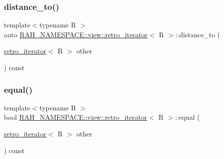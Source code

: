 \mbox{\label{struct_r_a_h___n_a_m_e_s_p_a_c_e_1_1view_1_1retro__iterator_a5332cbcf2b00984baeac1c823c163a1c}} 
\subsubsection{\texorpdfstring{distance\_to()}{distance\_to()}}
{\footnotesize\ttfamily template$<$typename R $>$ \\
auto \mbox{\hyperlink{struct_r_a_h___n_a_m_e_s_p_a_c_e_1_1view_1_1retro__iterator}{R\+A\+H\+\_\+\+N\+A\+M\+E\+S\+P\+A\+C\+E\+::view\+::retro\+\_\+iterator}}$<$ R $>$\+::distance\+\_\+to (\begin{DoxyParamCaption}\item[{\mbox{\hyperlink{struct_r_a_h___n_a_m_e_s_p_a_c_e_1_1view_1_1retro__iterator}{retro\+\_\+iterator}}$<$ R $>$}]{other }\end{DoxyParamCaption}) const\hspace{0.3cm}{\ttfamily [inline]}}

\mbox{\label{struct_r_a_h___n_a_m_e_s_p_a_c_e_1_1view_1_1retro__iterator_aaf1567eb8cf804b198bef2892e024064}} 
\subsubsection{\texorpdfstring{equal()}{equal()}}
{\footnotesize\ttfamily template$<$typename R $>$ \\
bool \mbox{\hyperlink{struct_r_a_h___n_a_m_e_s_p_a_c_e_1_1view_1_1retro__iterator}{R\+A\+H\+\_\+\+N\+A\+M\+E\+S\+P\+A\+C\+E\+::view\+::retro\+\_\+iterator}}$<$ R $>$\+::equal (\begin{DoxyParamCaption}\item[{\mbox{\hyperlink{struct_r_a_h___n_a_m_e_s_p_a_c_e_1_1view_1_1retro__iterator}{retro\+\_\+iterator}}$<$ R $>$}]{other }\end{DoxyParamCaption}) const\hspace{0.3cm}{\ttfamily [inline]}}

